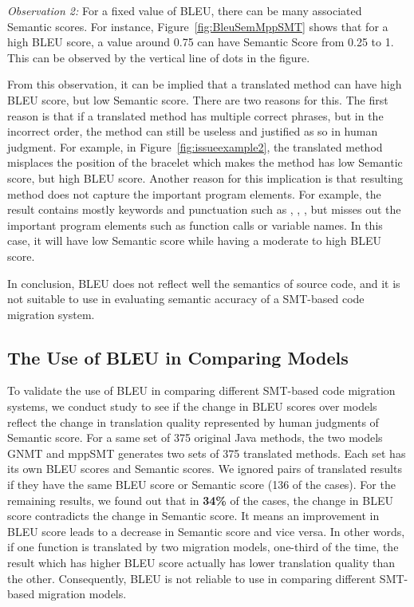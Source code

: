 \emph{Observation 2:} For a fixed value of BLEU, there can be many
associated Semantic scores. For instance,
Figure~\ref{fig:BleuSemMppSMT} shows that for a high BLEU score, a
value around 0.75 can have Semantic Score from 0.25 to 1. This can be
observed by the vertical line of dots in the figure.

From this observation, it can be implied that a translated method can
have high BLEU score, but low Semantic score. There are two reasons
for this. The first reason is that if a translated method has multiple
correct phrases, but in the incorrect order, the method can still be
useless and justified as so in human judgment.
%
For example, in Figure~\ref{fig:issueexample2}, the translated method
misplaces the position of the bracelet which makes the method has low
Semantic score, but high BLEU score. Another reason for this
implication is that resulting method does not capture the important
program elements. For example, the result contains mostly keywords and
punctuation such as , , \code{()}, but misses
out the important program elements such as function calls or variable
names. In this case, it will have low Semantic score while having
a moderate to high BLEU score.

In conclusion, BLEU does not reflect well the
semantics of source code, and it is not suitable to use in evaluating
semantic accuracy of a SMT-based code migration system.

\subsection{The Use of BLEU in Comparing Models}
To validate the use of BLEU in comparing different SMT-based code migration systems, we conduct study to see if the change in BLEU scores over models reflect the change in translation quality represented by human judgments of Semantic score. For a same set of 375 original Java methods, the two models GNMT and mppSMT generates two sets of 375 translated methods. Each set has its own BLEU scores and Semantic scores. We ignored pairs of translated results if they have the same BLEU score or Semantic score (136 of the cases). For the remaining results, we found out that in \textbf{34\%} of the cases, the change in BLEU score contradicts the change in Semantic score. It means an improvement in BLEU score leads to a decrease in Semantic score and vice versa. In other words, if one function is translated by two migration models, one-third of the time, the result which has higher BLEU score actually has lower translation quality than the other. Consequently, BLEU is not reliable to use in comparing different SMT-based migration models. 

